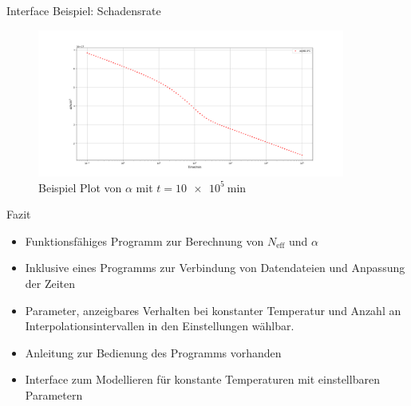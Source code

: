 \documentclass[aspectratio=1610, 9pt]{beamer}
\begin{document}
\begin{frame}{Interface Beispiel: Schadensrate}
  \begin{figure}
    \includegraphics[width=0.9\textwidth]{images/interface_damage.PNG}
    \caption{Beispiel Plot von $\alpha$ mit $t = \SI{10e5}{\minute}$}
  \end{figure}
\end{frame}

\begin{frame}{Fazit}
  \begin{itemize}
    \item Funktionsfähiges Programm zur Berechnung von $N_{\mathrm{eff}}$ und $\alpha$
    \medskip
    \item Inklusive eines Programms zur Verbindung von Datendateien und Anpassung der Zeiten
    \medskip
    \item Parameter, anzeigbares Verhalten bei konstanter Temperatur und Anzahl an Interpolationsintervallen in den
    Einstellungen wählbar.
    \medskip
    \item Anleitung zur Bedienung des Programms vorhanden
    \medskip
    \item Interface zum Modellieren für konstante Temperaturen mit einstellbaren Parametern
  \end{itemize}
\end{frame}
\end{document}
